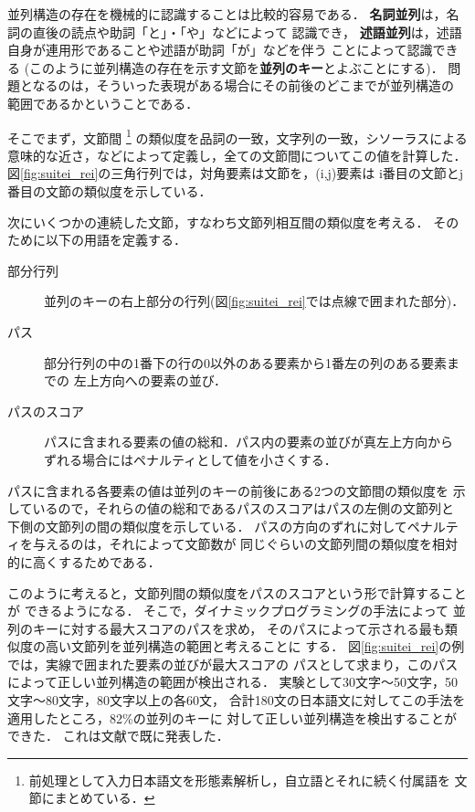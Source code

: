 並列構造の存在を機械的に認識することは比較的容易である．
{\bf 名詞並列}は，名詞の直後の読点や助詞「と」・「や」などによって
認識でき，
{\bf 述語並列}は，述語自身が連用形であることや述語が助詞「が」などを伴う
ことによって認識できる
(このように並列構造の存在を示す文節を{\bf 並列のキー}とよぶことにする)．
問題となるのは，そういった表現がある場合にその前後のどこまでが並列構造の
範囲であるかということである．

そこでまず，文節間
\footnote{
前処理として入力日本語文を形態素解析し，自立語とそれに続く付属語を
文節にまとめている．
}
の類似度を品詞の一致，文字列の一致，シソーラスによる
意味的な近さ，などによって定義し，全ての文節間についてこの値を計算した．
図\ref{fig:suitei_rei}の三角行列では，対角要素は文節を，(i,j)要素は
i番目の文節とj番目の文節の類似度を示している．

次にいくつかの連続した文節，すなわち文節列相互間の類似度を考える．
そのために以下の用語を定義する．
\begin{description}
  \item[部分行列] 
並列のキーの右上部分の行列(図\ref{fig:suitei_rei}では点線で囲まれた部分)．
  \item[パス] 
部分行列の中の1番下の行の0以外のある要素から1番左の列のある要素までの
左上方向への要素の並び．
  \item[パスのスコア] 
パスに含まれる要素の値の総和．パス内の要素の並びが真左上方向から
ずれる場合にはペナルティとして値を小さくする．
\end{description}
パスに含まれる各要素の値は並列のキーの前後にある2つの文節間の類似度を
示しているので，それらの値の総和であるパスのスコアはパスの左側の文節列と
下側の文節列の間の類似度を示している．
パスの方向のずれに対してペナルティを与えるのは，それによって文節数が
同じぐらいの文節列間の類似度を相対的に高くするためである．

このように考えると，文節列間の類似度をパスのスコアという形で計算することが
できるようになる．
そこで，ダイナミックプログラミングの手法によって
並列のキーに対する最大スコアのパスを求め，
そのパスによって示される最も類似度の高い文節列を並列構造の範囲と考えることに
する．
図\ref{fig:suitei_rei}の例では，実線で囲まれた要素の並びが最大スコアの
パスとして求まり，このパスによって正しい並列構造の範囲が検出される．
実験として30文字〜50文字，50文字〜80文字，80文字以上の各60文，
合計180文の日本語文に対してこの手法を適用したところ，82\%の並列のキーに
対して正しい並列構造を検出することができた．
これは文献\cite{KurohashiAndNagao1992}で既に発表した．

